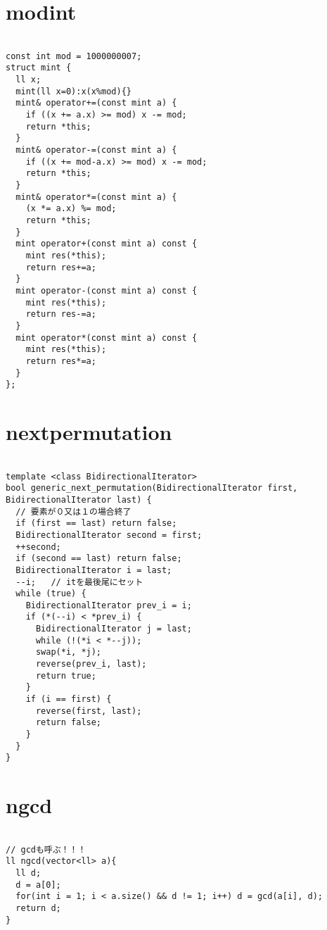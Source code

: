 \documentclass[a4j,titlepage]{jarticle} %
\begin{document}
\color{white}
\section{modint}
\color{black}
\begin{lstlisting}[caption=modint]

const int mod = 1000000007;
struct mint {
  ll x;
  mint(ll x=0):x(x%mod){}
  mint& operator+=(const mint a) {
    if ((x += a.x) >= mod) x -= mod;
    return *this;
  }
  mint& operator-=(const mint a) {
    if ((x += mod-a.x) >= mod) x -= mod;
    return *this;
  }
  mint& operator*=(const mint a) {
    (x *= a.x) %= mod;
    return *this;
  }
  mint operator+(const mint a) const {
    mint res(*this);
    return res+=a;
  }
  mint operator-(const mint a) const {
    mint res(*this);
    return res-=a;
  }
  mint operator*(const mint a) const {
    mint res(*this);
    return res*=a;
  }
};

\end{lstlisting}

\color{white}
\section{nextpermutation}
\color{black}
\begin{lstlisting}[caption=nextpermutation]

template <class BidirectionalIterator>
bool generic_next_permutation(BidirectionalIterator first, BidirectionalIterator last) {
  // 要素が０又は１の場合終了
  if (first == last) return false;
  BidirectionalIterator second = first;
  ++second;
  if (second == last) return false;
  BidirectionalIterator i = last;
  --i;   // itを最後尾にセット
  while (true) {
    BidirectionalIterator prev_i = i;
    if (*(--i) < *prev_i) {
      BidirectionalIterator j = last;
      while (!(*i < *--j));
      swap(*i, *j);
      reverse(prev_i, last);
      return true;
    }
    if (i == first) {
      reverse(first, last);
      return false;
    }
  }
}

\end{lstlisting}

\color{white}
\section{ngcd}
\color{black}
\begin{lstlisting}[caption=ngcd]

// gcdも呼ぶ！！！
ll ngcd(vector<ll> a){
  ll d;
  d = a[0];
  for(int i = 1; i < a.size() && d != 1; i++) d = gcd(a[i], d);
  return d;
}

\end{lstlisting}
\end{document}
